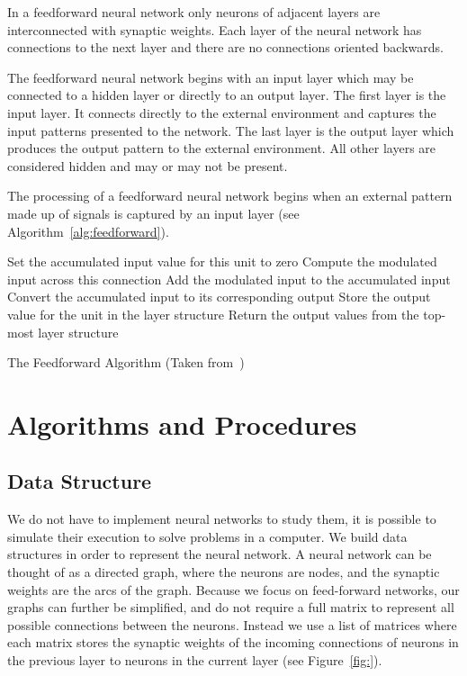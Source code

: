 \documentclass[11pt]{article}
\begin{document}
In a feedforward neural network only neurons of adjacent layers are interconnected with synaptic weights. Each layer of the neural
network has connections to the next layer and there are no connections oriented backwards.

The feedforward neural network begins with an input layer which may be connected to a hidden layer or directly to an output layer. The
first layer is the input layer. It connects directly to the external environment and captures the input patterns presented to the
network. The last layer is the output layer which produces the output pattern to the external environment. All other layers are
considered hidden and may or may not be present.

The processing of a feedforward neural network begins when an external pattern made up of signals is captured by an input layer (see
Algorithm~\ref{alg:feedforward}).

\begin{algorithm}%
\SetLine
{}
{
	{
		Set the accumulated input value for this unit to zero\;
			{
				Compute the modulated input across this connection\;
				Add the modulated input to the accumulated input\;
			}
		Convert the accumulated input to its corresponding output\;
		Store the output value for the unit in the layer structure\;
	}
	Return the output values from the top-most layer structure\;
}

\caption{The Feedforward Algorithm (Taken from~\cite{skapura})}
\label{alg:feedforward}
\end{algorithm}




\section{Algorithms and Procedures} %
\label{sec:algorithms_and_procedures}

\subsection{Data Structure} %
\label{sub:data_structure}

We do not have to implement neural networks to study them, it is possible to simulate their execution to solve problems in a computer.
We build data structures in order to represent the neural network. A neural network can be thought of as a directed graph, where the
neurons are nodes, and the synaptic weights are the arcs of the graph. Because we focus on feed-forward networks, our graphs can further
be simplified, and do not require a full matrix to represent all possible connections between the neurons. Instead we use a list of
matrices where each matrix stores the synaptic weights of the incoming connections of neurons in the previous layer to neurons in the current layer (see Figure~\ref{fig:}).
\end{document}
